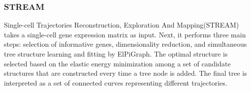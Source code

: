 \subsubsection{STREAM}
Single-cell Trajectories Reconstruction, Exploration And Mapping(STREAM) takes a single-cell gene expression matrix as input\citep{chen2019stream}. Next, it performs three main steps: selection of informative genes, dimensionality reduction, and simultaneous tree structure learning and fitting by ElPiGraph. The optimal structure is selected based on the elastic energy minimization among a set of candidate structures that are constructed every time a tree node is added. The final tree is interpreted as a set of connected curves representing different trajectories. 
